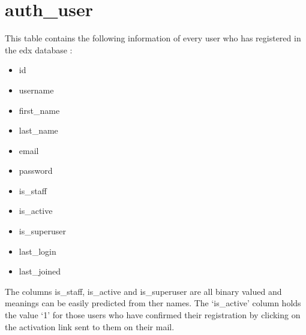 \documentclass[a4paper,12pt,oneside]{sphinxmanual}
\begin{document}
\section{auth\_user}
\label{document:auth-user}
This table contains the following information of every user who has registered in the edx database :
\begin{itemize}
\item {} 
id

\item {} 
username

\item {} 
first\_name

\item {} 
last\_name

\item {} 
email

\item {} 
password

\item {} 
is\_staff

\item {} 
is\_active

\item {} 
is\_superuser

\item {} 
last\_login

\item {} 
last\_joined

\end{itemize}

The columns is\_staff, is\_active and is\_superuser are all binary valued and meanings can be easily predicted from ther names. The `is\_active' column holds the value `1' for those users who have confirmed their registration by clicking on the activation link sent to them on their mail.
\end{document}
